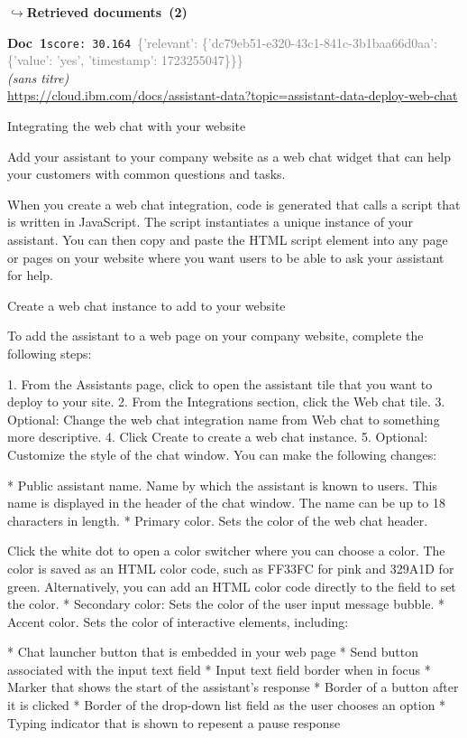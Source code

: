 \documentclass[a4paper,11pt]{article}
\begin{document}
\noindent\hfill{\footnotesize\textcolor{doccolor}{\textbf{$\hookrightarrow$\enspace Retrieved documents~(2)}}}
\begin{docenv}
{\footnotesize\textcolor{doccolor}{\textbf{Doc~1}}}\hfill{\tiny\texttt{score:~30.164}}\ {\tiny\textcolor{gray}{\{'relevant': \{'dc79eb51-e320-43c1-841c-3b1baa66d0aa': \{'value': 'yes', 'timestamp': 1723255047\}\}\}}}\\[3pt]
{\small\textit{(sans titre)}}\\[2pt]
{\tiny\url{https://cloud.ibm.com/docs/assistant-data?topic=assistant-data-deploy-web-chat}}\\[4pt]
{\footnotesize 
Integrating the web chat with your website 

Add your assistant to your company website as a web chat widget that can help your customers with common questions and tasks.

When you create a web chat integration, code is generated that calls a script that is written in JavaScript. The script instantiates a unique instance of your assistant. You can then copy and paste the HTML script element into any page or pages on your website where you want users to be able to ask your assistant for help.



 Create a web chat instance to add to your website 

To add the assistant to a web page on your company website, complete the following steps:



1. From the Assistants page, click to open the assistant tile that you want to deploy to your site.
2. From the Integrations section, click the Web chat tile.
3. Optional: Change the web chat integration name from Web chat to something more descriptive.
4. Click Create to create a web chat instance.
5. Optional: Customize the style of the chat window. You can make the following changes:



* Public assistant name. Name by which the assistant is known to users. This name is displayed in the header of the chat window. The name can be up to 18 characters in length.
* Primary color. Sets the color of the web chat header.

Click the white dot to open a color switcher where you can choose a color. The color is saved as an HTML color code, such as FF33FC for pink and 329A1D for green. Alternatively, you can add an HTML color code directly to the field to set the color.
* Secondary color: Sets the color of the user input message bubble.
* Accent color. Sets the color of interactive elements, including:



* Chat launcher button that is embedded in your web page
* Send button associated with the input text field
* Input text field border when in focus
* Marker that shows the start of the assistant’s response
* Border of a button after it is clicked
* Border of the drop-down list field as the user chooses an option
* Typing indicator that is shown to repesent a pause response}
\end{docenv}
\end{document}
